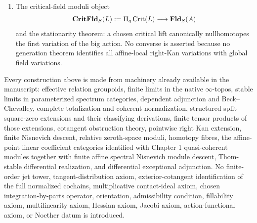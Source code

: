 \begin{theorem}
\begin{enumerate}
\item The critical-field moduli object
\[
    \mathbf{CritFld}_S(L)
    :=
    \Pi_q\operatorname{Crit}(L)
    \longrightarrow
    \mathbf{Fld}_S(A)
\]
and the stationarity theorem: a chosen critical lift canonically nullhomotopes the first variation of the big action. No converse is asserted because no generation theorem identifies all affine-local right-Kan variations with global field variations.
\end{enumerate}

Every construction above is made from machinery already available in the manuscript: effective relation groupoids, finite limits in the native \(\infty\)-topos, stable limits in parameterized spectrum categories, dependent adjunction and Beck--Chevalley, complete totalization and coherent normalization, structured split square-zero extensions and their classifying derivations, finite tensor products of those extensions, cotangent obstruction theory, pointwise right Kan extension, finite Nisnevich descent, relative zeroth-space moduli, homotopy fibres, the affine-point linear coefficient categories identified with Chapter 1 quasi-coherent modules together with finite affine spectral Nisnevich module descent, Thom-stable differential realization, and differential exceptional adjunction. No finite-order jet tower, tangent-distribution axiom, exterior-cotangent identification of the full normalized cochains, multiplicative contact-ideal axiom, chosen integration-by-parts operator, orientation, admissibility condition, fillability axiom, multilinearity axiom, Hessian axiom, Jacobi axiom, action-functional axiom, or Noether datum is introduced.
\end{theorem}

